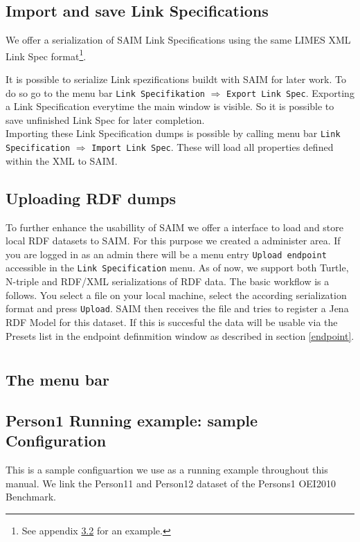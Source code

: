 \documentclass[oneside,a4paper,12pt]{memoir}
\begin{document}
\section{Import and save Link Specifications}
\label{ImportExport}
We offer a serialization of SAIM Link Specifications using the same LIMES XML Link Spec format\footnote{See appendix \ref{person1Spec} for an example.}.

It is possible to serialize Link spezifications buildt with SAIM for later work. To do so go to the menu bar \texttt{Link Specifikation} $\Rightarrow$ \texttt{Export Link Spec}. Exporting a Link Specification everytime the main window is visible. So it is possible to save unfinished Link Spec for later completion. \\
Importing these Link Specification dumps is possible by calling menu bar \texttt{Link Specification} $\Rightarrow$ \texttt{Import Link Spec}. These will load all properties defined within the XML to SAIM.

\section{Uploading RDF dumps}
\label{upload}
To further enhance the usabillity of SAIM we offer a interface to load and store local RDF datasets to SAIM. For this purpose we created a administer area. If you are logged in as an admin there will be a menu entry \texttt{Upload endpoint} accessible in the \texttt{Link Specification} menu. As of now, we support both Turtle, N-triple and RDF/XML serializations of RDF data. The basic workflow is a follows. You select a file on your local machine, select the according serialization format and press \texttt{Upload}. SAIM then receives the file and tries to register a Jena RDF Model for this dataset. If this is succesful the data will be usable via the Presets list in the endpoint definmition window as described in section \ref{endpoint}.




\newpage
\appendix
\chapter{}
\section{The menu bar}
\label{menuBar}


\section{Person1 Running example: sample Configuration}
\label{person1Spec}
This is a sample configuartion we use as a running example throughout this manual. We link the Person11 and Person12 dataset of the Persons1 OEI2010 Benchmark.\\
\lstset{language=XML}

\end{document}
